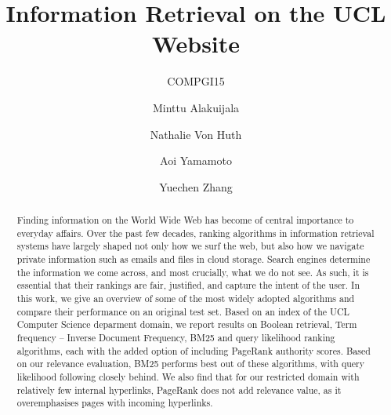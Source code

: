 \documentclass[sigconf]{acmart}
\begin{document}
\title{Information Retrieval on the UCL Website}
\subtitle{COMPGI15}


\author{Minttu Alakuijala}
\affiliation{\institution{}}

\author{Nathalie Von Huth}
\affiliation{\institution{}}

\author{Aoi Yamamoto}
\affiliation{\institution{}}

\author{Yuechen Zhang}
\affiliation{\institution{}}



\begin{abstract}
Finding information on the World Wide Web has become of central importance to everyday affairs. Over the past few decades, ranking algorithms in information retrieval systems have largely shaped not only how we surf the web, but also how we navigate private information such as emails and files in cloud storage. Search engines determine the information we come across, and most crucially, what we do not see. As such, it is essential that their rankings are fair, justified, and capture the intent of the user. In this work, we give an overview of some of the most widely adopted algorithms and compare their performance on an original test set. Based on an index of the UCL Computer Science deparment domain, we report results on Boolean retrieval, Term frequency -- Inverse Document Frequency, BM25 and query likelihood ranking algorithms, each with the added option of including PageRank authority scores. Based on our relevance evaluation, BM25 performs best out of these algorithms, with query likelihood following closely behind. We also find that for our restricted domain with relatively few internal hyperlinks, PageRank does not add relevance value, as it overemphasises pages with incoming hyperlinks.
\end{abstract}

\maketitle




 
\end{document}
